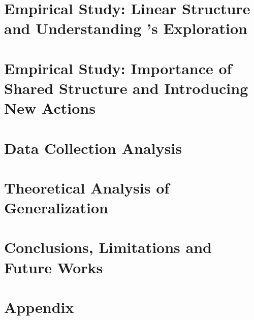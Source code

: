\documentclass[10pt]{article} %
\theoremstyle{plain}
\theoremstyle{definition}
\theoremstyle{remark}
\begin{document}
\vspace*{-0.5em}
\section{Empirical Study: Linear Structure and Understanding \pred's Exploration}
\label{sec:linear}
\vspace*{-0.5em}

% 


\vspace*{-0.5em}
\section{Empirical Study: Importance of Shared Structure and Introducing New Actions}
\label{sec:new-actions}
\vspace*{-0.5em}


\vspace*{-0.6em}
\section{Data Collection Analysis}
\label{sec:data-collection}
\vspace*{-0.6em}


\vspace*{-0.7em}
\section{Theoretical Analysis of Generalization}
\vspace*{-0.7em}
\label{sec:theory}




\vspace*{-1.0em}
\section{Conclusions, Limitations and Future Works}
\label{sec:conc}
\vspace*{-0.7em}






\appendix
\onecolumn
\section{Appendix}
\label{sec:appendix}

\end{document}
